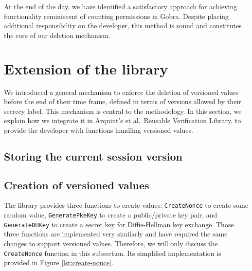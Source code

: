 At the end of the day, we have identified a satisfactory approach for achieving functionality reminiscent of counting permissions in Gobra. Despite placing additional responsibility on the developer, this method is sound and constitutes the core of our deletion mechanism.

\section{Extension of the library}
\label{sec:extension-of-the-library}

We introduced a general mechanism to enforce the deletion of versioned values before the end of their time frame, defined in terms of versions allowed by their secrecy label.
This mechanism is central to the methodology.
In this section, we explain how we integrate it in Arquint's et al.\ Reusable Verification Library, to provide the developer with functions handling versioned values.


\subsection{Storing the current session version}
\label{sec:storing-the-current-session-version}


\subsection{Creation of versioned values}
\label{sec:creation-of-versioned-values}

The library provides three functions to create values: \texttt{CreateNonce} to create some random value, \texttt{GeneratePkeKey} to create a public/private key pair, and \texttt{GenerateDHKey} to create a secret key for Diffie-Hellman key exchange. Those three functions are implemented very similarly and have required the same changes to support versioned values. Therefore, we will only discuss the \texttt{CreateNonce} function in this subsection. Its simplified implementation is provided in Figure \ref{lst:create-nonce}.

